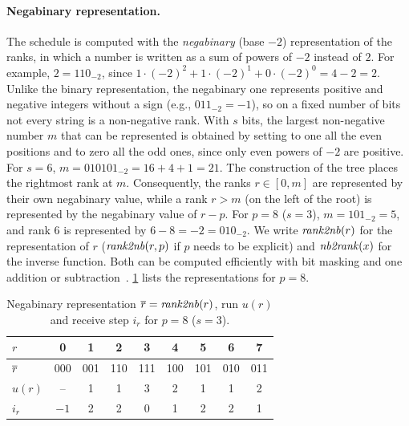 \paragraph{Negabinary representation.}
The schedule is computed with the \emph{negabinary} (base $-2$) representation of the ranks, in which a number is written as a sum of powers of $-2$ instead of $2$.
For example, $2=110_{-2}$, since $1\cdot(-2)^2+1\cdot(-2)^1+0\cdot(-2)^0=4-2=2$.
Unlike the binary representation, the negabinary one represents positive and negative integers without a sign (e.g., $011_{-2}=-1$), so on a fixed number of bits not every string is a non-negative rank.
With $s$ bits, the largest non-negative number $m$ that can be represented is obtained by setting to one all the even positions and to zero all the odd ones, since only even powers of $-2$ are positive. For $s=6$, $m=010101_{-2}=16+4+1=21$.
The construction of the \bine{} tree places the rightmost rank at $m$.
Consequently, the ranks $r\in[0,m]$ are represented by their own negabinary value, while a rank $r>m$ (on the left of the root) is represented by the negabinary value of $r-p$.
For $p=8$ ($s=3$), $m=101_{-2}=5$, and rank $6$ is represented by $6-8=-2=010_{-2}$.
We write $\mathit{rank2nb}(r)$ for the representation of $r$ ($\mathit{rank2nb}(r,p)$ if $p$ needs to be explicit) and $\mathit{nb2rank}(x)$ for the inverse function. Both can be computed efficiently with bit masking and one addition or subtraction~\cite{desensi2025bine}.
\cref{tab:bg-bine-p8} lists the representations for $p=8$.

\begin{table}[t]
\centering
\small
\caption{Negabinary representation $\overline{r}=\mathit{rank2nb}(r)$, run $u(r)$ and receive step $i_r$ for $p=8$ ($s=3$).}
\label{tab:bg-bine-p8}
\begin{tabular}{@{}l*{8}{c}@{}}
\toprule
$r$ & 0 & 1 & 2 & 3 & 4 & 5 & 6 & 7 \\
\midrule
$\overline{r}$ & 000 & 001 & 110 & 111 & 100 & 101 & 010 & 011 \\
$u(r)$ & -- & 1 & 1 & 3 & 2 & 1 & 1 & 2 \\
$i_r$ & $-1$ & 2 & 2 & 0 & 1 & 2 & 2 & 1 \\
\bottomrule
\end{tabular}
\end{table}

